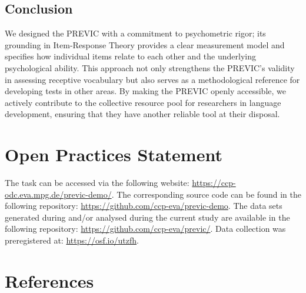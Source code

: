 \documentclass[
  man,floatsintext]{apa6}
\begin{document}
\hypertarget{conclusion}{%
\subsection{Conclusion}\label{conclusion}}

We designed the PREVIC with a commitment to psychometric rigor; its grounding in Item-Response Theory provides a clear measurement model and specifies how individual items relate to each other and the underlying psychological ability. This approach not only strengthens the PREVIC's validity in assessing receptive vocabulary but also serves as a methodological reference for developing tests in other areas. By making the PREVIC openly accessible, we actively contribute to the collective resource pool for researchers in language development, ensuring that they have another reliable tool at their disposal.

\hypertarget{open-practices-statement}{%
\section{Open Practices Statement}\label{open-practices-statement}}

The task can be accessed via the following website: \url{https://ccp-odc.eva.mpg.de/previc-demo/}. The corresponding source code can be found in the following repository: \url{https://github.com/ccp-eva/previc-demo}. The data sets generated during and/or analysed during the current study are available in the following repository: \url{https://github.com/ccp-eva/previc/}. Data collection was preregistered at: \url{https://osf.io/utzfh}.

\newpage

\hypertarget{references}{%
\section{References}\label{references}}
\end{document}
